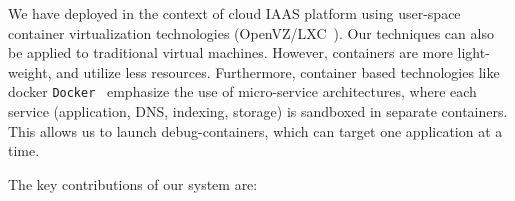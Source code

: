 We have deployed \parikshan in the context of cloud IAAS platform using user-space container virtualization technologies (OpenVZ/LXC~\cite{openvz,lxc}).
Our techniques can also be applied to traditional virtual machines. 
However, containers are more light-weight, and utilize less resources.
Furthermore, container based technologies like docker \texttt{Docker}~\cite{docker} emphasize the use of micro-service architectures, where each service (application, DNS, indexing, storage) is sandboxed in separate containers. 
This allows us to launch debug-containers, which can target one application at a time.

\noindent
The key contributions of our system are:
